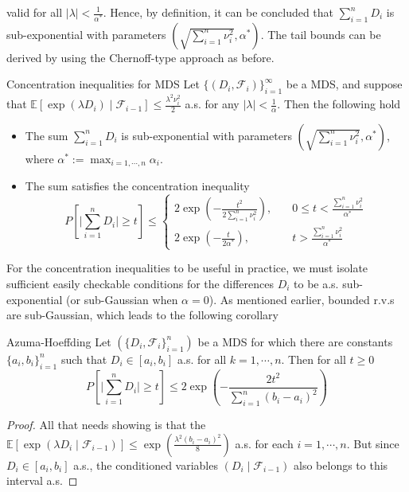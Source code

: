 \documentclass[10pt,handout,english]{beamer}
\newcommand{\E}{\mathbb{E}}
\newcommand{\F}{\mathcal{F}}
\begin{document}
\begin{frame}[allowframebreaks]
\[\]
valid for all $\lvert\lambda\rvert< \frac{1}{\alpha^*}$. Hence, by definition, it can be concluded that $\sum_{i=1}^nD_i$ is sub-exponential with parameters $(\sqrt{\sum_{i=1}^n\nu_i^2},\alpha^*)$.  The tail bounds can be derived by using the Chernoff-type approach as before.
\begin{block}{Concentration inequalities for MDS}
Let $\{(D_i,\F_i)\}_{i=1}^{\infty}$ be a MDS, and suppose that $\E[\exp(\lambda D_i)\mid\F_{i-1}]\leq\frac{\lambda^2\nu_i^2}{2}$ a.s. for any $\lvert\lambda\rvert<\frac{1}{\alpha}$. Then the following hold
\begin{itemize}
\item The sum $\sum_{i=1}^{n}D_i$ is sub-exponential with parameters $\left(\sqrt{\sum_{i=1}^{n}\nu_i^2},\alpha^*\right)$, where $\alpha^*:=\max_{i=1,\cdots,n}\alpha_i$.
\item The sum satisfies the concentration inequality
\[
P\left[\lvert \sum\limits_{i=1}^nD_i\rvert\geq t\right]\leq
\begin{cases}
2\exp\left(-\frac{t^2}{2\sum_{i=1}^{n}\nu_i^2}\right),\quad &0\leq t<\frac{\sum_{i=1}^{n}\nu_i^2}{\alpha^*}\\
2\exp\left(-\frac{t}{2\alpha^*}\right),\quad &t>\frac{\sum_{i=1}^{n}\nu_i^2}{\alpha^*}
\end{cases}
\]
\end{itemize}
\end{block}
For the concentration inequalities to be useful in practice, we must isolate sufficient easily checkable conditions for the differences $D_i$ to be a.s. sub-exponential (or sub-Gaussian when $\alpha=0$). As mentioned earlier, bounded r.v.s are sub-Gaussian, which leads to the following corollary
\begin{block}{Azuma-Hoeffding}
Let $(\{D_i,\F_i\}_{i=1}^{n})$ be a MDS for which there are constants $\{a_i,b_i\}_{i=1}^n$ such that $D_i\in[a_i,b_i]$ a.s. for all $k=1,\cdots,n$. Then for all $t\geq0$
\[
P\left[\lvert\sum\limits_{i=1}^{n}D_i\rvert\geq t\right]\leq2\exp\left(-\frac{2t^2}{\sum_{i=1}^{n}(b_i-a_i)^2}\right)
\]
\end{block}
\begin{proof}
All that needs showing is that the $\E[\exp(\lambda D_i\mid\F_{i-1})]\leq\exp\left(\frac{\lambda^2(b_i-a_i)^2}{8}\right)$ a.s. for each $i=1,\cdots,n$. But since $D_i\in[a_i,b_i]$ a.s., the conditioned variables $(D_i\mid\F_{i-1})$ also belongs to this interval a.s.
\end{proof}
\end{frame}
\end{document}
